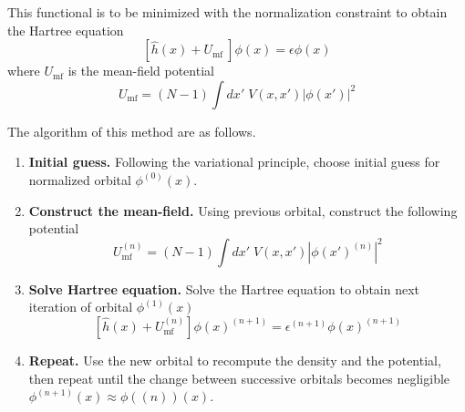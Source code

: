 \documentclass[../../../main.tex]{subfiles}
\begin{document}
This functional is to be minimized with the normalization constraint to obtain the Hartree equation
\begin{equation*}
  \left[   \hat{h }(x  )+   U_\text{mf }\right] \phi(x)    = \epsilon\phi(x)
\end{equation*}
where $U_\text{mf}$ is the mean-field potential
\begin{equation*}
  U_\text{mf}=
  (N-1)\int dx' \;V(x,x') |\phi(x')|^2
\end{equation*}

The algorithm of this method are as follows.
\begin{enumerate}
  \item \textbf{Initial guess.} Following the variational principle, choose initial guess for normalized orbital $\phi ^{(0)}(x)$.
  \item \textbf{Construct the mean-field.} Using previous orbital, construct the following potential
        \begin{equation*}
          U_\text{mf} ^{(n)}=
          (N-1)\int dx' \;V(x,x') |\phi(x') ^{(n)}|^2
        \end{equation*}
  \item \textbf{Solve Hartree equation.} Solve the Hartree equation to obtain next iteration of orbital $\phi ^{(1)}(x)$
        \begin{equation*}
          \left[   \hat{h }(x  )+   U_\text{mf } ^{(n)}\right] \phi(x)^{(n+1)}    = \epsilon ^{(n+1)}\phi(x)  ^{(n+1)}
        \end{equation*}
  \item \textbf{Repeat.} Use the new orbital to recompute the density and the potential, then repeat until the change between successive orbitals becomes negligible $\phi ^{(n+1)}(x)\approx \phi((n))(x)$.
\end{enumerate}
\end{document}
